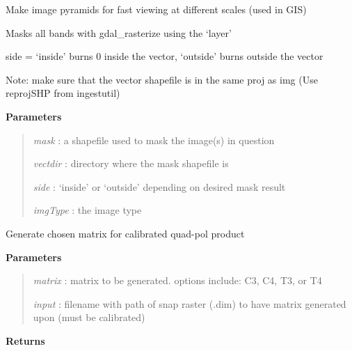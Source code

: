 \documentclass[letterpaper,10pt,openany,oneside]{sphinxmanual}
\begin{document}
\begin{fulllineitems}

\begin{fulllineitems}
\label{code:Image.Image.makePyramids}
Make image pyramids for fast viewing at different scales (used in GIS)

\end{fulllineitems}


\begin{fulllineitems}
\label{code:Image.Image.maskImg}
Masks all bands with gdal\_rasterize using the `layer'

side = `inside' burns 0 inside the vector, `outside' burns outside the vector

Note: make sure that the vector shapefile is in the same proj as img (Use reprojSHP from ingestutil)

\textbf{Parameters}
\begin{quote}

\emph{mask}    : a shapefile used to mask the image(s) in question

\emph{vectdir} : directory where the mask shapefile is

\emph{side}    : `inside' or `outside' depending on desired mask result

\emph{imgType} : the image type
\end{quote}

\end{fulllineitems}


\begin{fulllineitems}
\label{code:Image.Image.matrix_generation}
Generate chosen matrix for calibrated quad-pol product

\textbf{Parameters}
\begin{quote}

\emph{matrix} : matrix to be generated. options include: C3, C4, T3, or T4

\emph{input} : filename with path of snap raster (.dim) to have matrix generated upon (must be calibrated)
\end{quote}

\textbf{Returns}
\begin{quote}


\end{quote}
\end{fulllineitems}
\end{fulllineitems}
\end{document}
